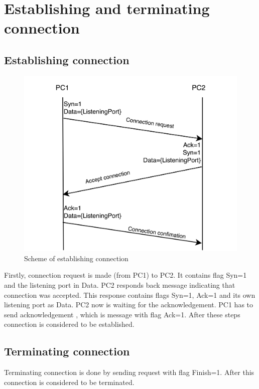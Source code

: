 \documentclass{article}
\begin{document}
\newpage
\section{Establishing and terminating connection}

\subsection{Establishing connection}
\begin{figure}[h]
    \centering
    \includegraphics[width=\textwidth]{images/connection.png}
    \caption{Scheme of establishing connection}
    \label{fig:mesh1}
\end{figure}
Firstly, connection request is made (from PC1) to PC2. It contains flag Syn=1 and the listening port in Data.
\newline
PC2 responds back message indicating that  connection was accepted. This response contains flags Syn=1, Ack=1 and its own listening port as Data. PC2 now is waiting for the acknowledgement.
\newline
PC1 has to send acknowledgement , which is message with flag Ack=1.
\newline
After these steps connection is considered to be established.

\subsection{Terminating connection}

Terminating connection is done by sending request with flag Finish=1. After this connection is considered to be terminated.
\end{document}
